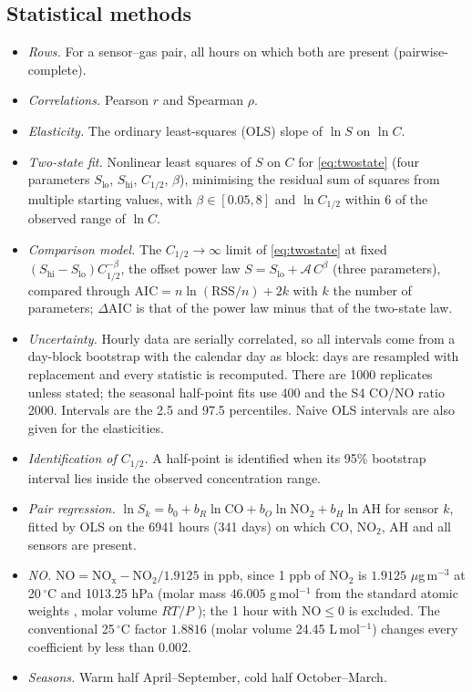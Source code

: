 \documentclass[11pt]{article}
\theoremstyle{definition}\newtheorem{definition}[theorem]{Definition}
\theoremstyle{remark}\newtheorem{remark}[theorem]{Remark}
\begin{document}
\subsection{Statistical methods}\label{sec:stat}
\begin{itemize}
\item \emph{Rows.} For a sensor--gas pair, all hours on which both are present (pairwise-complete).
\item \emph{Correlations.} Pearson $r$ and Spearman $\rho$.
\item \emph{Elasticity.} The ordinary least-squares (OLS) slope of $\ln S$ on $\ln C$.
\item \emph{Two-state fit.} Nonlinear least squares of $S$ on $C$ for \eqref{eq:twostate} (four parameters $S_\mathrm{lo}$, $S_\mathrm{hi}$, $C_{1/2}$, $\beta$), minimising the residual sum of squares from multiple starting values, with $\beta\in[0.05,8]$ and $\ln C_{1/2}$ within 6 of the observed range of $\ln C$.
\item \emph{Comparison model.} The $C_{1/2}\to\infty$ limit of \eqref{eq:twostate} at fixed $(S_\mathrm{hi}-S_\mathrm{lo})C_{1/2}^{-\beta}$, the offset power law $S=S_\mathrm{lo}+\mathcal A\,C^{\beta}$ (three parameters), compared through $\mathrm{AIC}=n\ln(\mathrm{RSS}/n)+2k$ with $k$ the number of parameters; $\Delta\mathrm{AIC}$ is that of the power law minus that of the two-state law.
\item \emph{Uncertainty.} Hourly data are serially correlated, so all intervals come from a day-block bootstrap \cite{Kunsch} with the calendar day as block: days are resampled with replacement and every statistic is recomputed. There are 1000 replicates unless stated; the seasonal half-point fits use 400 and the S4 CO/NO ratio 2000. Intervals are the 2.5 and 97.5 percentiles. Naive OLS intervals are also given for the elasticities.
\item \emph{Identification of $C_{1/2}$.} A half-point is identified when its 95\% bootstrap interval lies inside the observed concentration range.
\item \emph{Pair regression.} $\ln S_k=b_0+b_R\ln\mathrm{CO}+b_O\ln\mathrm{NO_2}+b_H\ln\mathrm{AH}$ for sensor $k$, fitted by OLS on the 6941 hours (341 days) on which CO, NO$_2$, AH and all sensors are present.
\item \emph{NO.} $\mathrm{NO}=\mathrm{NO_x}-\mathrm{NO_2}/1.9125$ in ppb, since 1 ppb of NO$_2$ is $1.9125$ $\mu$g\,m$^{-3}$ at 20\,$^\circ$C and 1013.25 hPa (molar mass $46.005$ g\,mol$^{-1}$ from the standard atomic weights \cite{CIAAW}, molar volume $RT/P$ \cite{CODATA}); the 1 hour with $\mathrm{NO}\le0$ is excluded. The conventional 25\,$^\circ$C factor $1.8816$ (molar volume 24.45 L\,mol$^{-1}$) changes every coefficient by less than $0.002$.
\item \emph{Seasons.} Warm half April--September, cold half October--March.
\end{itemize}
\end{document}
